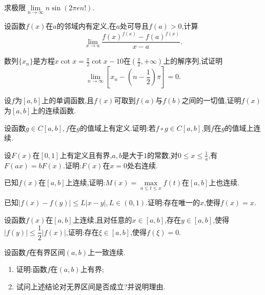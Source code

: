\documentclass[UTF8,a4paper]{ctexart}
\begin{document}
\begin{example}[上海财经大学,2023]
	求极限$ \lim\limits_{n\to\infty}n\sin \left (2\pi en!\right ) $.
\end{example}
\newpage
\begin{thinking}[西安交通大学,2023]
	设函数$ f(x) $在$ a $的邻域内有定义,在$ a $处可导且$ f(a) >0$,计算
	\[
	\lim\limits_{x\to a}\frac{f(x)^{f(x)}-f(a)^{f(x)}}{x-a}.
	\]
\end{thinking}
\begin{thinking}[吉林大学,2023]
	数列$ \{x_n\} $是方程$ x\cot x=\frac{\pi}{2}\cot x-10 $在$ \left (\frac{\pi}{2},+\infty\right ) $上的解序列,试证明
	\[
	\lim\limits_{n\to\infty}\left [x_n-\left (n-\frac12\right )\pi\right ]=0.
	\]
\end{thinking}
\newpage
\begin{example}[安徽大学,2023]
	设$ f $为$ [a,b] $上的单调函数,且$ f(x) $可取到$ f(a) $与$ f(b) $之间的一切值,证明$ f(x) $为$ [a,b] $上的连续函数.
\end{example}
\begin{example}[电子科技大学,2023]
	设函数$ g\in C[a,b] ,f$在$ g $的值域上有定义.证明:若$f\circ g\in C[a,b]$,则$ f $在$ g $的值域上连续.
\end{example}
\begin{example}[华南理工大学,2023]
	设$ F(x) $在$ [0,1] $上有定义且有界,$ a,b$是大于$1$的常数,对$ 0\leq x\leq \frac{1}{a} $,有$ F(ax)=bF(x) $.证明:$ F(x) $在$ x=0 $处右连续.
\end{example}
\newpage
\begin{thinking}[北京师范大学,2023]
	已知$ f(x) $在$ [a,b] $上连续,证明:$ M(x)=\max\limits_{a\leq t\leq x} f(t)$在$ [a,b] $上也连续.
\end{thinking}
\begin{thinking}[北京师范大学,2023]
	已知$ \lvert f(x)-f(y)\rvert\leq L\lvert x-y\rvert ,L\in \left (0,1\right )$.证明:存在唯一的$ x $,使得$ f(x) =x$.
\end{thinking}
\begin{thinking}[中国科学院大学,2023]
	设函数$ f(x) $在$ [a,b] $上连续,且对任意的$ x\in [a,b] $,存在$ y\in [a,b] $,使得$ \vert f(y)\rvert\leq\dfrac12\lvert f(x)\rvert $,证明:存在$ \xi  \in [a,b]$,使得$ f(\xi) =0$.
\end{thinking}
\newpage
\begin{example}[华中师范大学,2023]
	设函数$ f $在有界区间$ \left (a,b\right ) $上一致连续.
	\begin{enumerate}
		\item 证明:函数$ f $在$ (a,b) $上有界;
		\item 试问上述结论对无界区间是否成立?并说明理由.
	\end{enumerate}
\end{example}
\end{document}
